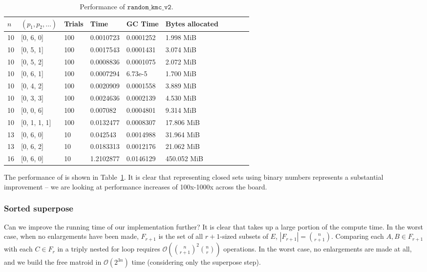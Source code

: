 \begin{table}[ht!]
  \centering
  \begin{tabular}{llllllllll}
    \toprule
    $n$ & $(p_1, p_2, \ldots)$ & Trials & Time  & GC Time & Bytes allocated \\
    \midrule
    10 & [0, 6, 0] & 100 & 0.0010723 & 0.0001252 & 1.998 MiB \\ 
    10 & [0, 5, 1] & 100 & 0.0017543 & 0.0001431 & 3.074 MiB \\ 
    10 & [0, 5, 2] & 100 & 0.0008836 & 0.0001075 & 2.072 MiB \\ 
    10 & [0, 6, 1] & 100 & 0.0007294 & 6.73e-5 & 1.700 MiB \\ 
    10 & [0, 4, 2] & 100 & 0.0020909 & 0.0001558 & 3.889 MiB \\ 
    10 & [0, 3, 3] & 100 & 0.0024636 & 0.0002139 & 4.530 MiB \\ 
    10 & [0, 0, 6] & 100 & 0.007082 & 0.0004801 & 9.314 MiB \\ 
    10 & [0, 1, 1, 1] & 100 & 0.0132477 & 0.0008307 & 17.806 MiB \\ 
    13 & [0, 6, 0] & 10 & 0.042543 & 0.0014988 & 31.964 MiB \\ 
    13 & [0, 6, 2] & 10 & 0.0183313 & 0.0012176 & 21.062 MiB \\ 
    16 & [0, 6, 0] & 10 & 1.2102877 & 0.0146129 & 450.052 MiB \\ 
    \bottomrule
  \end{tabular}
  \caption{Performance of $\texttt{random\_kmc\_v2}$.}
  \label{tab:perf_v2}
\end{table}

The performance of  is shown in Table~\ref{tab:perf_v2}. It is clear that representing closed sets using binary numbers represents a substantial improvement -- we are looking at performance increases of 100x-1000x across the board.


\subsubsection{Sorted superpose}
Can we improve the running time of our implementation further? It is clear that  takes up a large portion of the compute time. In the worst case, when no enlargements have been made, $F_{r+1}$ is the set of all $r+1$-sized subsets of $E$, $|F_{r+1}| = {\binom{n}{r+1}}$. Comparing each $A,B \in F_{r+1}$ with each $C \in F_r$ in a triply nested for loop requires $\mathcal{O}({\binom{n}{r+1}}^2{\binom{n}{r}})$ operations. In the worst case, no enlargements are made at all, and we build the free matroid in $\mathcal{O}(2^{3n})$ time (considering only the superpose step).

